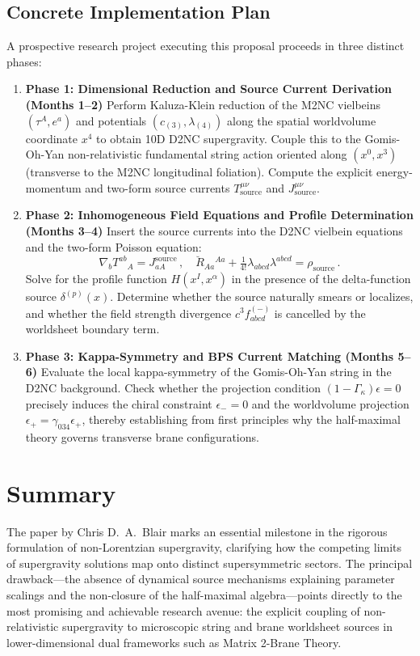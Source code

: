 \documentclass[11pt,a4paper]{article}
\begin{document}
\subsection{Concrete Implementation Plan}
A prospective research project executing this proposal proceeds in three distinct phases:

\begin{enumerate}
    \item \textbf{Phase 1: Dimensional Reduction and Source Current Derivation (Months 1--2)}
    Perform Kaluza-Klein reduction of the M2NC vielbeins $(\tau^A, e^a)$ and potentials $(c_{(3)}, \lambda_{(4)})$ along the spatial worldvolume coordinate $x^4$ to obtain 10D D2NC supergravity. Couple this to the Gomis-Oh-Yan non-relativistic fundamental string action oriented along $(x^0, x^3)$ (transverse to the M2NC longitudinal foliation). Compute the explicit energy-momentum and two-form source currents $T^{\mu\nu}_{\text{source}}$ and $J^{\mu\nu}_{\text{source}}$.

    \item \textbf{Phase 2: Inhomogeneous Field Equations and Profile Determination (Months 3--4)}
    Insert the source currents into the D2NC vielbein equations and the two-form Poisson equation:
    \begin{equation}
        \nabla_b T^{ab}{}_A = J^{\text{source}}_{a A} \,,\quad 
        \breve{R}_{Aa}{}^{Aa} + \tfrac{1}{4!} \lambda_{abcd} \lambda^{abcd} = \rho_{\text{source}} \,.
    \end{equation}
    Solve for the profile function $H(x^I, x^\alpha)$ in the presence of the delta-function source $\delta^{(p)}(x)$. Determine whether the source naturally smears or localizes, and whether the field strength divergence $c^3 f^{(-)}_{abcd}$ is cancelled by the worldsheet boundary term.

    \item \textbf{Phase 3: Kappa-Symmetry and BPS Current Matching (Months 5--6)}
    Evaluate the local kappa-symmetry of the Gomis-Oh-Yan string in the D2NC background. Check whether the projection condition $(1 - \Gamma_\kappa) \epsilon = 0$ precisely induces the chiral constraint $\epsilon_- = 0$ and the worldvolume projection $\epsilon_+ = \gamma_{034} \epsilon_+$, thereby establishing from first principles why the half-maximal theory governs transverse brane configurations.
\end{enumerate}

\section{Summary}
The paper by Chris D.~A.~Blair marks an essential milestone in the rigorous formulation of non-Lorentzian supergravity, clarifying how the competing limits of supergravity solutions map onto distinct supersymmetric sectors. The principal drawback—the absence of dynamical source mechanisms explaining parameter scalings and the non-closure of the half-maximal algebra—points directly to the most promising and achievable research avenue: the explicit coupling of non-relativistic supergravity to microscopic string and brane worldsheet sources in lower-dimensional dual frameworks such as Matrix 2-Brane Theory.
\end{document}
